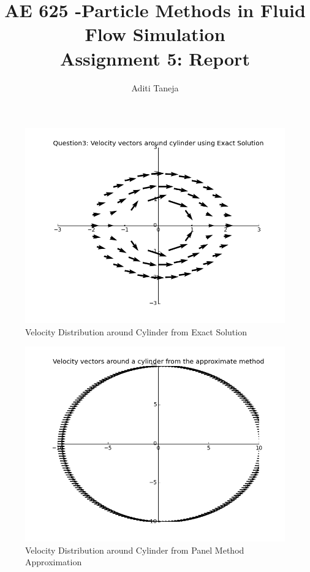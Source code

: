 \documentclass{article}
\title{AE 625 -Particle Methods in Fluid Flow Simulation \\ Assignment 5: Report }
\author{Aditi Taneja}
\date{}
\begin{document}
\maketitle

\begin{figure}[H]   \label{figure}
\includegraphics[width=12cm]{velocity_plot_exact.png}
\caption{Velocity Distribution around Cylinder from Exact Solution}
\label{figure:}
\end{figure}

\begin{figure}[H] \label{figure}
\includegraphics[width=12cm]{approx_q1.png}
\caption{Velocity Distribution around Cylinder from Panel Method Approximation}
\label{figure:}
\end{figure}
\end{document}
